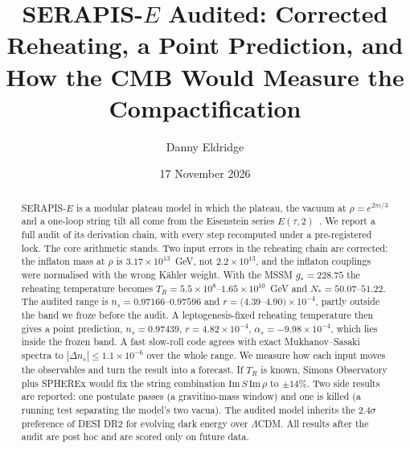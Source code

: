 \documentclass[aps,prd,twocolumn,superscriptaddress,nofootinbib,showkeys]{revtex4-2}
\begin{document}
\title{SERAPIS-$E$ Audited: Corrected Reheating, a Point Prediction, and How the CMB Would Measure the Compactification}
\author{Danny Eldridge}
\date{17 November 2026}
\begin{abstract}
SERAPIS-$E$ is a modular plateau model in which the plateau, the vacuum at $\rho=e^{2\pi i/3}$ and a one-loop string tilt all come from the Eisenstein series $E(\tau,2)$~\cite{P3}. We report a full audit of its derivation chain, with every step recomputed under a pre-registered lock. The core arithmetic stands. Two input errors in the reheating chain are corrected: the inflaton mass at $\rho$ is $3.17\times10^{13}$~GeV, not $2.2\times10^{13}$, and the inflaton couplings were normalised with the wrong K\"ahler weight. With the MSSM $g_*=228.75$ the reheating temperature becomes $T_R=5.5\times10^8$--$1.65\times10^{10}$~GeV and $N_*=50.07$--$51.22$. The audited range is $n_s=0.97166$--$0.97596$ and $r=(4.39$--$4.90)\times10^{-4}$, partly outside the band we froze before the audit. A leptogenesis-fixed reheating temperature then gives a point prediction, $n_s=0.97439$, $r=4.82\times10^{-4}$, $\alpha_s=-9.98\times10^{-4}$, which lies inside the frozen band. A fast slow-roll code agrees with exact Mukhanov--Sasaki spectra to $|\Delta n_s|\le1.1\times10^{-6}$ over the whole range. We measure how each input moves the observables and turn the result into a forecast. If $T_R$ is known, Simons Observatory plus SPHEREx would fix the string combination $\mathrm{Im}\,S\,\mathrm{Im}\,\rho$ to $\pm14\%$. Two side results are reported: one postulate passes (a gravitino-mass window) and one is killed (a running test separating the model's two vacua). The audited model inherits the $2.4\sigma$ preference of DESI DR2 for evolving dark energy over $\Lambda$CDM. All results after the audit are post hoc and are scored only on future data.
\end{abstract}
\maketitle
\end{document}
